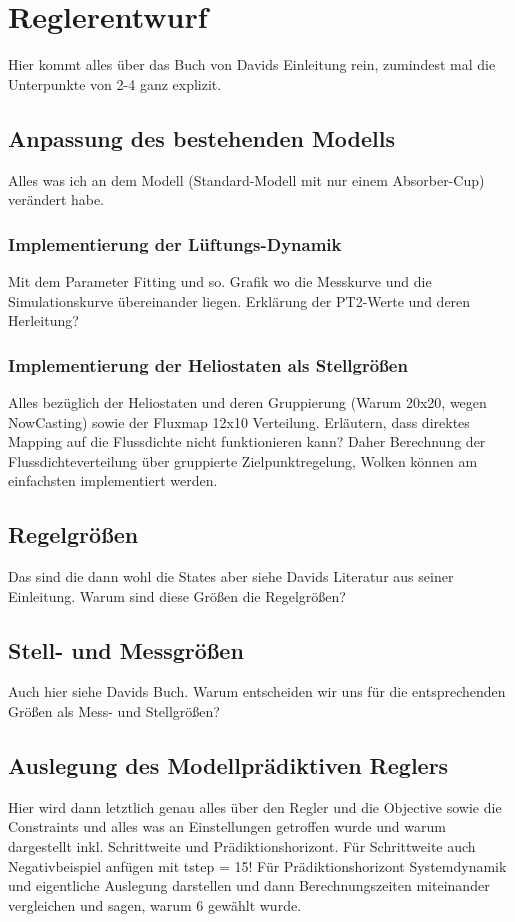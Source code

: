 \chapter{Reglerentwurf} \label{ch_Reglerentwurf}
Hier kommt alles über das Buch von Davids Einleitung rein, zumindest mal die Unterpunkte von 2-4 ganz explizit.

\section{Anpassung des bestehenden Modells} \label{sec_AnpassungModell}
Alles was ich an dem Modell (Standard-Modell mit nur einem Absorber-Cup) verändert habe.

\subsection{Implementierung der Lüftungs-Dynamik} \label{subsec_ImplementierungFan}
Mit dem Parameter Fitting und so.
Grafik wo die Messkurve und die Simulationskurve übereinander liegen.
Erklärung der PT2-Werte und deren Herleitung?

\subsection{Implementierung der Heliostaten als Stellgrößen} \label{subsec_ImplementierungHeliostate}
Alles bezüglich der Heliostaten und deren Gruppierung (Warum 20x20, wegen NowCasting) sowie der Fluxmap 12x10 Verteilung.
Erläutern, dass direktes Mapping auf die Flussdichte nicht funktionieren kann?
Daher Berechnung der Flussdichteverteilung über gruppierte Zielpunktregelung, Wolken können am einfachsten implementiert werden.

\section{Regelgrößen} \label{sec_Regelgrößen}
Das sind die dann wohl die States aber siehe Davids Literatur aus seiner Einleitung.
Warum sind diese Größen die Regelgrößen?

\section{Stell- und Messgrößen} \label{sec_StellMessgrößen}
Auch hier siehe Davids Buch.
Warum entscheiden wir uns für die entsprechenden Größen als Mess- und Stellgrößen?

\section{Auslegung des Modellprädiktiven Reglers} \label{sec_AuslegungMPC}
Hier wird dann letztlich genau alles über den Regler und die Objective sowie die Constraints und alles was an Einstellungen getroffen wurde und warum dargestellt inkl. Schrittweite und Prädiktionshorizont. Für Schrittweite auch Negativbeispiel anfügen mit tstep = 15! Für Prädiktionshorizont Systemdynamik und eigentliche Auslegung darstellen und dann Berechnungszeiten miteinander vergleichen und sagen, warum 6 gewählt wurde.

